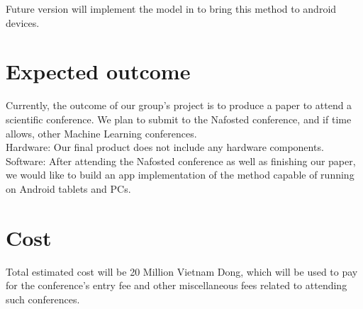 \documentclass[a4paper,12pt]{report}
\begin{document}
Future version will implement the model in
\textcite{Pacha2017} to bring this method to android devices.

\section{Expected outcome}

Currently, the outcome of our group's project is to produce a paper to attend a scientific conference.
We plan to submit to the Nafosted conference, and if time allows, other Machine Learning conferences.\\

Hardware: Our final product does not include any hardware components.\\

Software: After attending the Nafosted conference as well as finishing our
paper, we would like to build an app implementation of the method capable of
running on Android tablets and PCs.

\section{Cost}
Total estimated cost will be 20 Million Vietnam Dong, which will be used to pay
for the conference's entry fee and other miscellaneous fees related to attending
such conferences.\\
\end{document}
